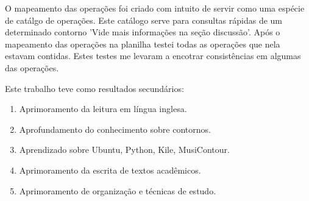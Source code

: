\documentclass[11pt]{article}
\begin{document}
\label{sec:resultados}



O mapeamento das operações foi criado com intuito de servir como uma 
espécie de catálgo de operações. Este catálogo serve para consultas rápidas de
um determinado contorno 'Vide mais informações na seção discussão'.
Após o mapeamento das operações na planilha testei todas as operações que 
nela estavam contidas. Estes testes me levaram a encotrar consistências em 
algumas das operações.

Este trabalho teve como resultados secundários:

\begin{enumerate}
\item Aprimoramento da leitura em língua inglesa.
\item Aprofundamento do conhecimento sobre contornos.
\item Aprendizado sobre Ubuntu, Python, Kile, MusiContour.
\item Aprimoramento da escrita de textos acadêmicos.
\item Aprimoramento de organização e técnicas de estudo.
\end{enumerate}
\end{document}
